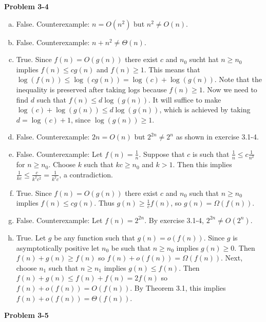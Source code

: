 \documentclass{article}
\begin{document}
\noindent\textbf{Problem 3-4}\\
\begin{enumerate}[a.]
\item False.  Counterexample: $n = O(n^2)$ but $n^2 \neq O(n)$. \\

\item False.  Counterexample: $n + n^2 \neq \Theta(n)$. \\

\item True.  Since $f(n) = O(g(n))$ there exist $c$ and $n_0$ sucht hat $n \geq n_0$ implies $f(n) \leq cg(n)$ and $f(n) \geq 1$.  This means that $\log(f(n)) \leq \log(cg(n)) = \log(c) + \log(g(n))$.  Note that the inequality is preserved after taking logs because $f(n) \geq 1$.  Now we need to find $d$ such that $f(n) \leq d\log(g(n))$.  It will suffice to make $\log(c) + \log(g(n)) \leq d\log(g(n))$, which is achieved by taking $d = \log(c) + 1$, since $\log(g(n)) \geq 1$.\\

\item False.  Counterexample: $2n = O(n)$ but $2^{2n} \neq 2^{n}$ as shown in exercise 3.1-4. \\

\item False.  Counterexample: Let $f(n) = \frac{1}{n}$. Suppose that $c$ is such that $\frac{1}{n} \leq c \frac{1}{n^2}$ for $n \geq n_0$.  Choose $k$ such that $kc \geq n_0$ and $k > 1$.  Then this implies $\frac{1}{kc} \leq \frac{c}{k^2c^2} = \frac{1}{k^2 c}$, a contradiction.  \\

\item True.  Since $f(n) = O(g(n))$ there exist $c$ and $n_0$ such that $n \geq n_0$ implies $f(n) \leq c g(n)$.  Thus $g(n) \geq \frac{1}{c} f(n)$, so $g(n) = \Omega(f(n))$. \\

\item False.  Counterexample: Let $f(n) = 2^{2n}$.  By exercise 3.1-4, $2^{2n} \neq O(2^n)$. \\

\item True.  Let $g$ be any function such that $g(n) = o(f(n))$.  Since $g$ is asymptotically positive let $n_0$ be such that $n \geq n_0$ implies $g(n) \geq 0$.  Then $f(n) + g(n) \geq f(n)$ so $f(n) + o(f(n)) = \Omega(f(n))$.  Next, choose $n_1$ such that $n \geq n_1$ implies $g(n) \leq f(n)$.  Then $f(n) + g(n) \leq f(n) + f(n) = 2f(n)$ so $f(n) + o(f(n)) = O(f(n))$.  By Theorem 3.1, this implies $f(n) + o(f(n)) = \Theta(f(n))$. 
\end{enumerate}
\noindent\textbf{Problem 3-5}\\
\end{document}

